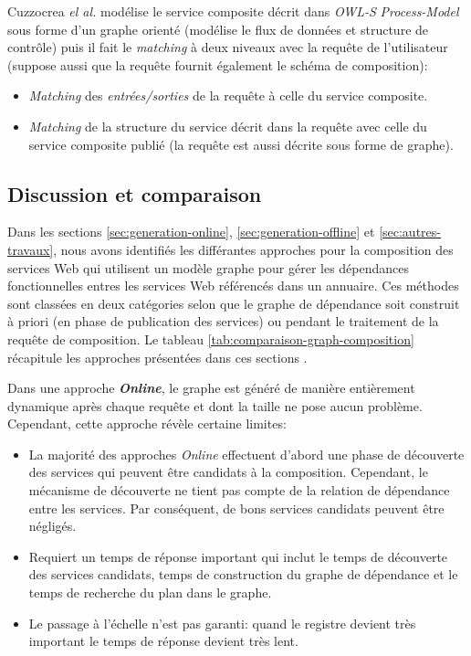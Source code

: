   Cuzzocrea \emph{el al.} \cite{cuzzocrea2011flexible} modélise le
  service composite décrit dans \textit{OWL-S} \textit{Process-Model}
  sous forme d'un graphe orienté (modélise le flux de données et
  structure de contrôle) puis il fait le \textit{matching} à deux
  niveaux avec la requête de l'utilisateur (suppose aussi que la
  requête fournit également le schéma de composition):

  \SpecialItem
  \begin{itemize}
  \item \textit{Matching} des \textit{entrées/sorties} de la requête à
    celle du service composite.

  \item \textit{Matching} de la structure du service décrit dans la
    requête avec celle du service composite publié (la requête est
    aussi décrite sous forme de graphe).
  \end{itemize}
  \enddescription

  \subsection{Discussion et comparaison}
  \label{sec:discussion-comparaison}
  Dans les sections \ref{sec:generation-online},
  \ref{sec:generation-offline} et \ref{sec:autres-travaux}, nous avons
  identifiés les différantes approches pour la composition des services
  Web qui utilisent un modèle graphe pour gérer les dépendances
  fonctionnelles entres les services Web référencés dans un
  annuaire. Ces méthodes sont classées en deux catégories selon que le
  graphe de dépendance soit construit à priori (en phase de
  publication des services) ou pendant le traitement de la requête de
  composition. Le tableau \ref{tab:comparaison-graph-composition}
  récapitule les approches présentées dans ces sections . \bigskip

  Dans une approche \textbf{\textit{Online}}, le graphe est généré de
  manière entièrement dynamique après chaque requête et dont la taille
  ne pose aucun problème. Cependant, cette approche révèle certaine limites:

  \SpecialItem
  \begin{itemize}
  \item La majorité des approches \textit{Online} effectuent d'abord une
    phase de découverte des services qui peuvent être candidats à la
    composition. Cependant, le mécanisme de découverte ne tient pas
    compte de la relation de dépendance entre les services. Par
    conséquent, de bons services candidats peuvent être négligés.

  \item Requiert un temps de réponse important qui inclut le temps de
    découverte des services candidats, temps de construction du graphe
    de dépendance et le temps de recherche du plan dans le graphe.

  \item Le passage à l'échelle n'est pas garanti: quand le registre
    devient très important le temps de réponse devient très
    lent.\bigskip

  \end{itemize}
  \enddescription

